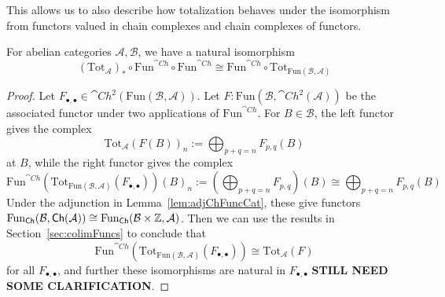 This allows us to also describe how totalization behaves under the isomorphism from functors valued in chain complexes and chain complexes of functors.

\begin{lem}[label=lem:totFuncCh]
    For abelian categories $\mathcal{A},\mathcal{B}$, we have a natural isomorphism
    \begin{equation*}
        (\text{Tot}_{\mathcal{A}})_*\circ \text{Fun}^{\cat{Ch}}\circ \text{Fun}^{\cat{Ch}} \cong \text{Fun}^{\cat{Ch}}\circ \text{Tot}_{\text{Fun}(\mathcal{B},\mathcal{A})}
    \end{equation*}
\end{lem}
\begin{proof}
    Let $F_{\bullet,\bullet} \in \cat{Ch}^2(\text{Fun}(\mathcal{B},\mathcal{A}))$. Let $F:\text{Fun}(\mathcal{B},\cat{Ch}^2(\mathcal{A}))$ be the associated functor under two applications of $\text{Fun}^{\cat{Ch}}$. For $B \in \mathcal{B}$, the left functor gives the complex
    \begin{equation*}
        \text{Tot}_{\mathcal{A}}(F(B))_n := \bigoplus_{p+q=n}F_{p,q}(B)
    \end{equation*}
    at $B$, while the right functor gives the complex
    \begin{equation*}
        \text{Fun}^{\cat{Ch}}(\text{Tot}_{\text{Fun}(\mathcal{B},\mathcal{A})}(F_{\bullet,\bullet}))(B)_n := \left(\bigoplus_{p+q=n}F_{p,q}\right)(B) \cong \bigoplus_{p+q=n}F_{p,q}(B)
    \end{equation*}
    Under the adjunction in Lemma~\ref{lem:adjChFuncCat}, these give functors $\text{Fun}_{\textup{\textsf{Ch}}}(\mathcal{B},\textup{\textsf{Ch}}(\mathcal{A}))\cong \text{Fun}_{\textup{\textsf{Ch}}}(\mathcal{B}\times \mathbb Z,\mathcal{A})$. Then we can use the results in Section~\ref{sec:colimFuncs} to conclude that 
    \begin{equation*}
        \text{Fun}^{\cat{Ch}}(\text{Tot}_{\text{Fun}(\mathcal{B},\mathcal{A})}(F_{\bullet,\bullet})) \cong  \text{Tot}_{\mathcal{A}}(F)
    \end{equation*} 
    for all $F_{\bullet,\bullet}$, and further these isomorphisms are natural in $F_{\bullet,\bullet}$ \textbf{STILL NEED SOME CLARIFICATION}.
\end{proof}